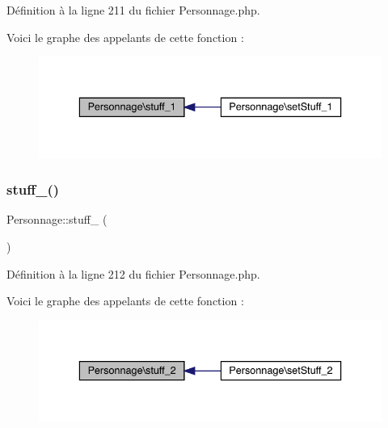 Définition à la ligne 211 du fichier Personnage.\+php.

Voici le graphe des appelants de cette fonction \+:\nopagebreak
\begin{figure}[H]
\begin{center}
\leavevmode
\includegraphics[width=336pt]{class_personnage_ac2301a97182f37929b2815d6718730ed_icgraph}
\end{center}
\end{figure}
\mbox{\label{class_personnage_af4f0e9a0215cc8a99ccc3313380f51cd}} 
\subsubsection{\texorpdfstring{stuff\+\_()}{stuff\_2()}}
{\footnotesize\ttfamily Personnage\+::stuff\+\_ (\begin{DoxyParamCaption}{ }\end{DoxyParamCaption})}



Définition à la ligne 212 du fichier Personnage.\+php.

Voici le graphe des appelants de cette fonction \+:\nopagebreak
\begin{figure}[H]
\begin{center}
\leavevmode
\includegraphics[width=336pt]{class_personnage_af4f0e9a0215cc8a99ccc3313380f51cd_icgraph}
\end{center}
\end{figure}
\mbox{\label{class_personnage_a5bc1399ae3e6d8f280b5df47e2c74a30}} 
